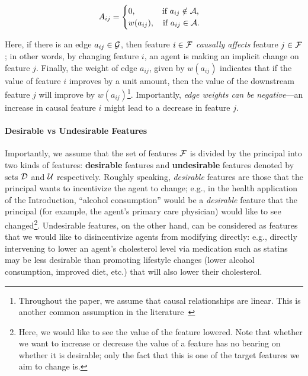 \begin{defn}
\begin{align}\label{eq:adj_matrix}
       A_{ij} = \begin{cases}
       0, \quad \quad \quad \, \text{if $a_{ij} \notin \mathcal{A}$,}\\
       w(a_{ij}), \quad \text{if $a_{ij} \in \mathcal{A}$.}
       \end{cases}
\end{align}
\end{defn}

Here, if there is an edge $a_{ij} \in \mathcal{G}$, then feature $i \in \mathcal{F}$ \emph{causally affects} feature $j \in \mathcal{F}$; in other words, by changing feature $i$, an agent is making an implicit change on feature $j$. Finally, the weight of edge $a_{ij}$, given by $ w(a_{ij})$ indicates that if the value of feature $i$ improves by a unit amount, then the value of the downstream feature $j$ will improve by $w(a_{ij})$\footnote{Throughout the paper, we assume that causal relationships are linear. This is another common assumption in the literature~\cite{kleinberg2019classifiers,shavit2020incentives}}. Importantly, \textit{edge weights can be negative}---an increase in causal feature $i$ might lead to a decrease in feature $j$. 

\paragraph{Desirable vs Undesirable Features} Importantly, we assume that the set of features $\mathcal{F}$ is divided by the principal into two kinds of features: \textbf{desirable} features and \textbf{undesirable} features denoted by sets $\mathcal{D}$ %
and $\mathcal{U}$ %
respectively. Roughly speaking, \emph{desirable} features are those that the principal wants to incentivize the agent to change; e.g., in the health application of the Introduction, ``alcohol consumption'' would be a \emph{desirable} feature that the principal (for example, the agent's primary care physician) would like to see changed\footnote{Here, we would like to see the value of the feature lowered. Note that whether we want to increase or decrease the value of a feature has no bearing on whether it is desirable; only the fact that this is one of the target features we aim to change is.}. Undesirable features, on the other hand, can be considered as features that %
we would like to disincentivize agents from modifying directly: e.g., directly intervening to lower an agent's cholesterol level via medication such as statins may be less desirable than promoting lifestyle changes (lower alcohol consumption, improved diet, etc.) that will also lower their cholesterol.


